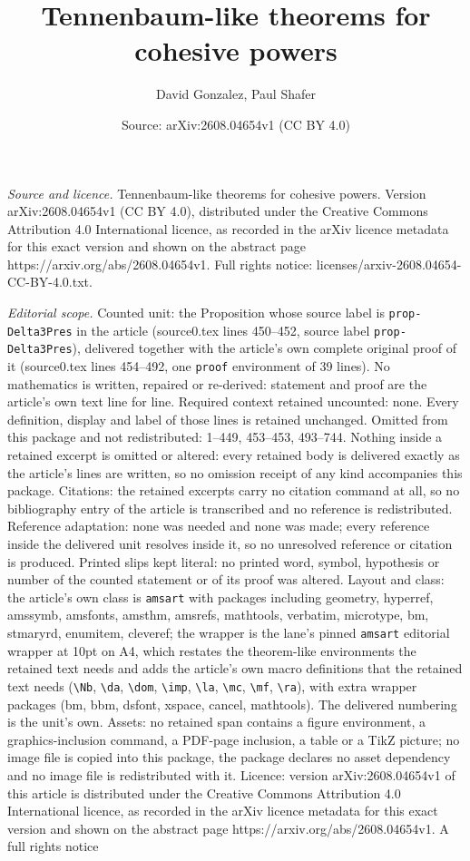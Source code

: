 \documentclass[10pt,a4paper]{amsart}
\title[Tennenbaum-like theorems for cohesive powers]{Tennenbaum-like theorems for cohesive powers}
\author{David Gonzalez, Paul Shafer}
\date{Source: arXiv:2608.04654v1 (CC BY 4.0)}
\begin{document}
\maketitle

\noindent\emph{Source and licence.} Tennenbaum-like theorems for cohesive powers. Version arXiv:2608.04654v1 (CC BY 4.0), distributed under the Creative Commons Attribution 4.0 International licence, as recorded in the arXiv licence metadata for this exact version and shown on the abstract page https://arxiv.org/abs/2608.04654v1. Full rights notice: licenses/arxiv-2608.04654-CC-BY-4.0.txt.\par\smallskip

\noindent\textit{Editorial scope.} Counted unit: the Proposition whose source label is \texttt{prop-Delta3Pres} in the article (source0.tex lines 450--452, source label \texttt{prop-Delta3Pres}), delivered together with the article's own complete original proof of it (source0.tex lines 454--492, one \texttt{proof} environment of 39 lines). No mathematics is written, repaired or re-derived: statement and proof are the article's own text line for line. Required context retained uncounted: none. Every definition, display and label of those lines is retained unchanged. Omitted from this package and not redistributed: 1--449, 453--453, 493--744. Nothing inside a retained excerpt is omitted or altered: every retained body is delivered exactly as the article's lines are written, so no omission receipt of any kind accompanies this package. Citations: the retained excerpts carry no citation command at all, so no bibliography entry of the article is transcribed and no reference is redistributed. Reference adaptation: none was needed and none was made; every reference inside the delivered unit resolves inside it, so no unresolved reference or citation is produced. Printed slips kept literal: no printed word, symbol, hypothesis or number of the counted statement or of its proof was altered. Layout and class: the article's own class is \texttt{amsart} with packages including geometry, hyperref, amssymb, amsfonts, amsthm, amsrefs, mathtools, verbatim, microtype, bm, stmaryrd, enumitem, cleveref; the wrapper is the lane's pinned \texttt{amsart} editorial wrapper at 10pt on A4, which restates the theorem-like environments the retained text needs and adds the article's own macro definitions that the retained text needs (\texttt{\textbackslash Nb}, \texttt{\textbackslash da}, \texttt{\textbackslash dom}, \texttt{\textbackslash imp}, \texttt{\textbackslash la}, \texttt{\textbackslash mc}, \texttt{\textbackslash mf}, \texttt{\textbackslash ra}), with extra wrapper packages (bm, bbm, dsfont, xspace, cancel, mathtools). The delivered numbering is the unit's own. Assets: no retained span contains a figure environment, a graphics-inclusion command, a PDF-page inclusion, a table or a TikZ picture; no image file is copied into this package, the package declares no asset dependency and no image file is redistributed with it. Licence: version arXiv:2608.04654v1 of this article is distributed under the Creative Commons Attribution 4.0 International licence, as recorded in the arXiv licence metadata for this exact version and shown on the abstract page https://arxiv.org/abs/2608.04654v1. A full rights notice 
\end{document}

